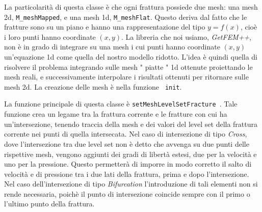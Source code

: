 La particolarità di questa classe è che ogni frattura possiede due mesh: una mesh 2d, \texttt{M\_meshMapped}, e una mesh 1d, \texttt{M\_meshFlat}. Questo deriva dal fatto che le fratture sono su un piano e hanno una rappresentazione del tipo $y=f(x)$, cioè i loro punti hanno coordinate $(x,y)$. La libreria che noi usiamo, \textit{GetFEM++}, non è in grado di integrare su una mesh i cui punti hanno coordinate $(x,y)$ un'equazione 1d come quella del nostro modello ridotto. L'idea è quindi quella di risolvere il problema integrando sulle mesh " piatte " 1d ottenute proiettando le mesh reali, e successivamente interpolare i risultati ottenuti per ritornare sulle mesh 2d. La creazione delle mesh è nella funzione \texttt{ init}.
\par La funzione principale di questa classe è  \texttt{setMeshLevelSetFracture }.
Tale funzione crea un legame tra la frattura corrente e le fratture con cui ha un'intersezione, tenendo traccia della mesh e dei valori del level set della frattura corrente nei punti di quella intersecata. Nel caso di intersezione di tipo \textit{Cross}, dove l'intersezione tra due level set non è detto che avvenga su due punti delle rispettive mesh, vengono aggiunti dei gradi di libertà estesi, due per la velocità e uno per la pressione. Questo permetterà di imporre in modo corretto il salto di velocità e di pressione tra i due lati della frattura, prima e dopo l'intersezione. Nel caso dell'intersezione di tipo \textit{Bifurcation} l'introduzione di tali elementi non si rende necessaria, poichè il punto di intersezione coincide sempre con il primo o l'ultimo punto della frattura. 


